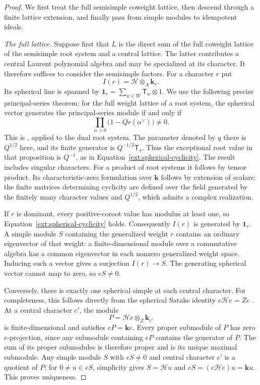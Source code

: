 \begin{proof}
  We first treat the full semisimple coweight lattice, then descend through
  a finite lattice extension, and finally pass from simple modules to
  idempotent ideals.

  \smallskip
  \noindent\emph{The full lattice.}
  Suppose first that $L$ is the direct sum of the full coweight lattice of
  the semisimple root system and a central lattice.  The latter contributes
  a central Laurent polynomial algebra and may be specialized at its
  character.  It therefore suffices to consider the semisimple factors.
  For a character $r$ put
  \[
    I(r)=\mathcal H\otimes_A\mathbf k_r.
  \]
  Its spherical line is spanned by
  $\mathbf 1_r=\sum_{w\in W}\mathsf T_w\otimes1$.
  We use the following precise principal-series theorem: for the full
  weight lattice of a root system, the spherical vector generates the
  principal-series module if and only if
  \begin{equation}\label{ext:spherical-cyclicity}
    \prod_{\alpha>0}\bigl(1-Qr(\alpha^\vee)\bigr)\ne0.
  \end{equation}
  This is \cite[Proposition~2.11(b)]{Ram}, applied to the dual root system.
  The parameter denoted by $q$ there is $Q^{1/2}$ here, and its finite
  generator is $Q^{-1/2}\mathsf T_s$.  Thus the exceptional root value in
  that proposition is $Q^{-1}$, as in
  Equation~\eqref{ext:spherical-cyclicity}.  The result includes singular
  characters.  For a product of root systems it follows by tensor product.
  Its characteristic-zero formulation over $\mathbf k$ follows by
  extension of scalars: the finite matrices determining cyclicity are
  defined over the field generated by the finitely many character values
  and $Q^{1/2}$, which admits a complex realization.

  If $r$ is dominant, every positive-coroot value has modulus at least
  one, so Equation~\eqref{ext:spherical-cyclicity} holds.  Consequently
  $I(r)$ is generated by $\mathbf 1_r$.  A simple module $S$ containing
  the generalized weight $r$ contains an ordinary eigenvector of that
  weight: a finite-dimensional module over a commutative algebra has a
  common eigenvector in each nonzero generalized weight space.  Inducing
  such a vector gives a surjection $I(r)\to S$.  The generating spherical
  vector cannot map to zero, so $eS\ne0$.

  Conversely, there is exactly one spherical simple at each central
  character.  For completeness, this follows directly from the spherical
  Satake identity $e\mathcal He=Ze$
  \cite[Sections~4.1 and~4.6, Equation~(4.6.1)]{HainesKottwitzPrasad}.
  At a central character $c'$, the
  module
  \[
    P=\mathcal He\otimes_Z\mathbf k_{c'}
  \]
  is finite-dimensional and satisfies $eP=\mathbf k e$.  Every proper
  submodule of $P$ has zero $e$-projection, since any submodule containing
  $eP$ contains the generator of $P$.  The sum of its proper submodules
  is therefore proper and is its unique maximal submodule.  Any simple
  module $S$ with $eS\ne0$ and central character $c'$ is a quotient of
  $P$: for $0\ne u\in eS$, simplicity gives $S=\mathcal H u$ and
  $eS=(e\mathcal He)u=\mathbf k u$.  This proves uniqueness.


\end{proof}
